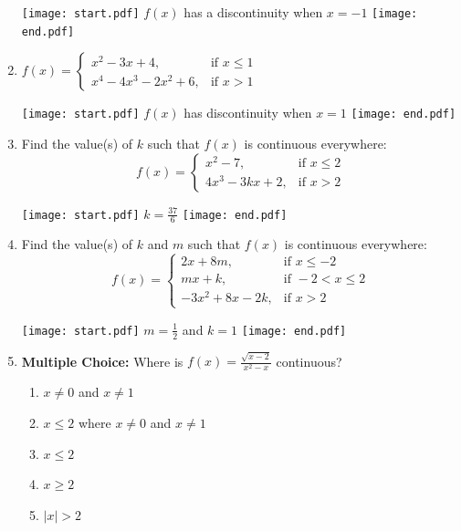 \documentclass[12pt]{article}
\begin{document}
\begin{enumerate}
\texttt{[image: start.pdf]}
{{$f(x)$ has a discontinuity when $x=-1$}}
\texttt{[image: end.pdf]}


\item $f(x) = \begin{cases} 
x^2-3x+4, & \text{if } x\leq1 \\
x^4-4x^3-2x^2+6, & \text{if } x>1 \end{cases}$ 

\texttt{[image: start.pdf]}
{{$f(x)$ has discontinuity when $x=1$}}
\texttt{[image: end.pdf]}


\item Find the value(s) of $k$ such that $f(x)$ is continuous everywhere:\\
$$\displaystyle f(x) = \begin{cases}
x^2-7, & \text{if } x\leq 2 \\
4x^3-3kx+2, & \text{if } x>2 \end{cases}$$

\texttt{[image: start.pdf]}
{{$\displaystyle k=\frac{37}{6}$}}
\texttt{[image: end.pdf]}


\item Find the value(s) of $k$ and $m$ such that $f(x)$ is continuous everywhere: $$f(x) = \begin{cases}
2x+8m, & \text{if } x\leq -2 \\
mx+k, & \text{if } -2<x \leq 2 \\
-3x^2+8x-2k, & \text{if } x>2 \end{cases}$$ 

\texttt{[image: start.pdf]}
{{$\displaystyle m = \frac{1}{2}$ and $k=1$}}
\texttt{[image: end.pdf]}


\item {\bf Multiple Choice:} Where is $f(x)=\frac{\sqrt{x-2}}{x^2-x}$ continuous?

\begin{enumerate}

\item $x\neq 0$ and $x \neq 1$

\item $x \leq 2$ where $x\neq 0$ and $x \neq 1$

\item $x\leq 2$

\item $x \geq 2$

\item $|x|>2$

\end{enumerate}


\end{enumerate}
\end{document}
